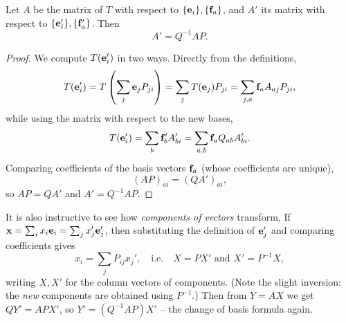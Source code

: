 \documentclass[a4paper]{scrartcl}
\begin{document}
\begin{theorem}
	Let $A$ be the matrix of $T$ with respect to $\{\mathbf{e}_i\}, \{\mathbf{f}_a\}$, and $A'$ its matrix with respect to $\{\mathbf{e}_i'\}, \{\mathbf{f}_a'\}$. Then
	$$
	A' = Q^{-1}AP.
	$$
\end{theorem}
\begin{proof}
	We compute $T(\mathbf{e}_i')$ in two ways. Directly from the definitions,
	$$
	T(\mathbf{e}_i') = T\left(\sum_j \mathbf{e}_j P_{ji}\right) = \sum_j T(\mathbf{e}_j)P_{ji} = \sum_{j, a} \mathbf{f}_a A_{aj}P_{ji},
	$$
	while using the matrix with respect to the new bases,
	$$
	T(\mathbf{e}_i') = \sum_b \mathbf{f}_b' A'_{bi} = \sum_{a, b} \mathbf{f}_a Q_{ab}A'_{bi}.
	$$
	Comparing coefficients of the basis vectors $\mathbf{f}_a$ (whose coefficients are unique),
	$$
	(AP)_{ai} = (QA')_{ai},
	$$
	so $AP = QA'$ and $A' = Q^{-1}AP$.
\end{proof}

It is also instructive to see how \emph{components of vectors} transform. If $\mathbf{x} = \sum_i x_i \mathbf{e}_i = \sum_j x_j' \mathbf{e}_j'$, then substituting the definition of $\mathbf{e}_j'$ and comparing coefficients gives
$$
x_i = \sum_j P_{ij}x_j', \quad \text{i.e.} \quad X = PX' \text{ and } X' = P^{-1}X,
$$
writing $X, X'$ for the column vectors of components. (Note the slight inversion: the \emph{new} components are obtained using $P^{-1}$.) Then from $Y = AX$ we get $QY' = APX'$, so $Y' = (Q^{-1}AP)X'$ -- the change of basis formula again.
\end{document}
